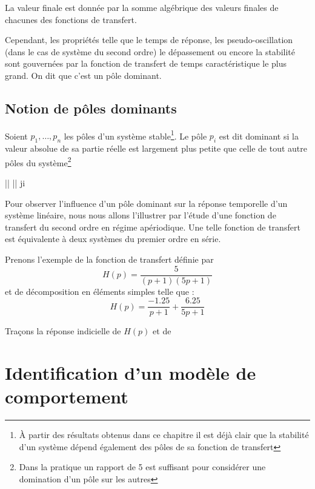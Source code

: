 La valeur finale est donnée par la somme algébrique des valeurs finales de chacunes
des fonctions de transfert.

Cependant, les propriétés telle que le temps de réponse, 
les pseudo-oscillation (dans le cas de système du second ordre) 
le dépassement ou encore la stabilité sont gouvernées 
par la fonction de transfert de 
temps caractéristique le plus grand. On dit que c'est un pôle dominant.

\subsection{Notion de pôles dominants}

Soient $p_1,\ldots,p_n$ les pôles d'un système stable\footnote{À partir 
des résultats obtenus dans ce chapitre il est déjà clair que la stabilité
d'un système dépend également des pôles de sa fonction de transfert}.
Le pôle $p_i$ est dit dominant si la valeur absolue
de sa partie réelle est largement plus petite que celle de tout autre pôles 
du système\footnote{Dans la pratique un rapport de 5 est 
suffisant pour considérer une domination d'un pôle sur les autres}
\begin{bequation}
	\big|\big| \ll \big|\big|\;\; \forall j\neq i
\end{bequation}

Pour observer l'influence d'un pôle dominant sur 
la réponse temporelle d'un système linéaire, nous
nous allons l'illustrer par l'étude d'une fonction 
de transfert du second ordre en régime apériodique.
Une telle fonction de transfert est équivalente à deux
systèmes du premier ordre en série.

Prenons l'exemple de la fonction de transfert définie par  
$$
H(p)=\dfrac{5}{(p+1)(5p+1)}
$$
et de décomposition en éléments simples telle que :
$$
H(p)=\dfrac{-1.25}{p+1}+\dfrac{6.25}{5p+1}
$$

Traçons la réponse indicielle de $H(p)$ et de


\begin{center}
{\tikzset{external/export=false}       
}
\end{center}


\newpage
\section{Identification d'un modèle de comportement}


